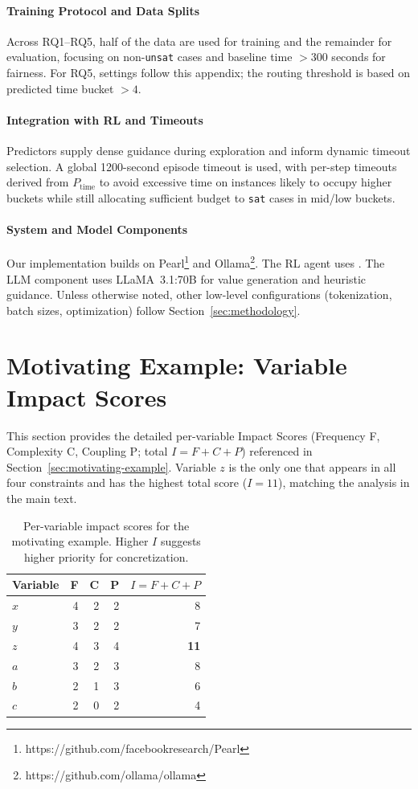 \documentclass[acmsmall,screen,review,anonymous]{acmart}
\begin{document}
\paragraph{Training Protocol and Data Splits}
Across RQ1--RQ5, half of the data are used for training and the remainder for evaluation, focusing on non-\texttt{unsat} cases and baseline time $>300$ seconds for fairness. For RQ5, settings follow this appendix; the routing threshold is based on predicted time bucket $>4$.

\paragraph{Integration with RL and Timeouts}
Predictors supply dense guidance during exploration and inform dynamic timeout selection. A global 1200-second episode timeout is used, with per-step timeouts derived from $P_{\text{time}}$ to avoid excessive time on instances likely to occupy higher buckets while still allocating sufficient budget to \texttt{sat} cases in mid/low buckets.

\paragraph{System and Model Components}
Our implementation builds on Pearl\footnote{https://github.com/facebookresearch/Pearl} and Ollama\footnote{https://github.com/ollama/ollama}. The RL agent uses \SAC{}. The LLM component uses LLaMA~3.1:70B for value generation and heuristic guidance. Unless otherwise noted, other low-level configurations (tokenization, batch sizes, optimization) follow Section~\ref{sec:methodology}.

\section{Motivating Example: Variable Impact Scores}
\label{sec:appendix-motivating-scores}

This section provides the detailed per-variable Impact Scores (Frequency F, Complexity C, Coupling P; total $I=F+C+P$) referenced in Section~\ref{sec:motivating-example}. Variable $z$ is the only one that appears in all four constraints and has the highest total score ($I=11$), matching the analysis in the main text.

\begin{table}[h]
  \centering
  \caption{Per-variable impact scores for the motivating example. Higher $I$ suggests higher priority for concretization.}
  \label{tab:motivating-impact-scores}
  \begin{tabular}{lrrrr}
    \toprule
    Variable & F & C & P & $I=F+C+P$ \\
    \midrule
    $x$ & 4 & 2 & 2 & 8 \\
    $y$ & 3 & 2 & 2 & 7 \\
    $z$ & 4 & 3 & 4 & \textbf{11} \\
    $a$ & 3 & 2 & 3 & 8 \\
    $b$ & 2 & 1 & 3 & 6 \\
    $c$ & 2 & 0 & 2 & 4 \\
    \bottomrule
  \end{tabular}
\end{table}
\end{document}
